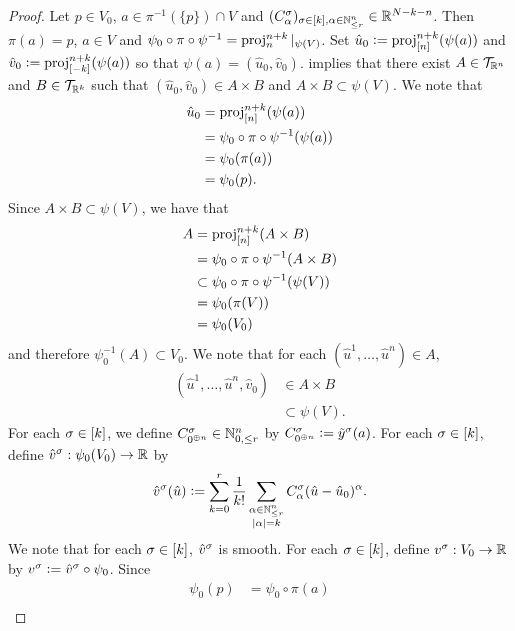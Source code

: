 \documentclass{book}
\begin{document}
\begin{proof}
	Let $p \in V_0$, $a \in \pi^{-1}(\{p\}) \cap V$ and $(C^{\sigma}_{\alpha})_{\sigma \in [k], \alpha \in \mathbb{N}^n_{\leq r}} \in \mathbb{R}^{N-k-n}$. Then $\pi(a) = p$, $a \in V$ and $\psi_0 \circ \pi \circ \psi^{-1} = \operatorname{\text{proj}}^{n+k}_{n}|_{\psi(V)}$. Set $\hat{u}_0 \vcentcolon= \operatorname{\text{proj}}^{n+k}_{[n]}(\psi(a))$ and $\hat{v}_0 \vcentcolon= \operatorname{\text{proj}}^{n+k}_{[-k]}(\psi(a))$ so that $\psi(a) = (\hat{u}_0, \hat{v}_0)$.  implies that there exist $A \in \mathcal{T}_{\mathbb{R}^n}$ and $B \in \mathcal{T}_{\mathbb{R}^k}$ such that $(\hat{u}_0, \hat{v}_0) \in A \times B$ and $A \times B \subset \psi(V)$. We note that 
	\begin{align*}
		\hat{u}_0 
		& = \operatorname{\text{proj}}^{n+k}_{[n]}(\psi(a)) \\
		& = \psi_0 \circ \pi \circ \psi^{-1}(\psi(a)) \\
		& = \psi_0 (\pi(a)) \\
		& = \psi_0(p).
	\end{align*}
	Since $A \times B \subset \psi(V)$, we have that
	\begin{align*}
		A 
		& = \operatorname{\text{proj}}^{n+k}_{[n]}(A \times B) \\
		& = \psi_0 \circ \pi \circ \psi^{-1}(A \times B) \\
		& \subset \psi_0 \circ \pi \circ \psi^{-1}(\psi(V)) \\
		& = \psi_0 ( \pi(V)) \\ 
		& = \psi_0(V_0)
	\end{align*}
	and therefore $\psi_0^{-1}(A) \subset V_0$.
	We note that for each $(\hat{u}^1, \ldots, \hat{u}^n) \in A$, 
	\begin{align*}
		(\hat{u}^1, \ldots, \hat{u}^n, \hat{v}_0)
		& \in A \times B \\
		& \subset \psi(V).
	\end{align*}
	For each $\sigma \in [k]$, we define $C^{\sigma}_{0^{\oplus n}} \in \mathbb{N}^n_{0, \leq r}$ by $C^{\sigma}_{0^{\oplus n}} \vcentcolon= \tilde{y}^{\sigma}(a)$. For each $\sigma \in [k]$, define $\hat{v}^{\sigma}: \psi_0(V_0) \rightarrow \mathbb{R}$ by 
	$$\hat{v}^{\sigma}(\hat{u}) \vcentcolon= \sum_{k=0}^r \frac{1}{k!} \sum_{\substack{\alpha \in \mathbb{N}^n_{\leq r} \\ |\alpha| = k}} C^{\sigma}_{\alpha} (\hat{u} - \hat{u}_0)^{\alpha}.$$
	We note that for each $\sigma \in [k]$, $\hat{v}^{\sigma}$ is smooth. For each $\sigma \in [k]$, define $v^{\sigma}: V_0 \rightarrow \mathbb{R}$ by $v^{\sigma} \vcentcolon= \hat{v}^{\sigma} \circ \psi_0$. Since 
	\begin{align*}
		\psi_0(p)
		& = \psi_0 \circ \pi(a) \\

\end{align*}
\end{proof}
\end{document}
